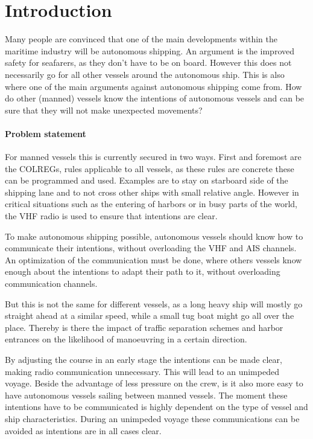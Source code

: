 \chapter{Introduction}
\label{sec:introduction}

Many people are convinced that one of the main developments within the maritime industry will be autonomous shipping. An argument is the improved safety for seafarers, as they don't have to be on board. However this does not necessarily go for all other vessels around the autonomous ship. This is also where one of the main arguments against autonomous shipping come from. How do other (manned) vessels know the intentions of autonomous vessels and can be sure that they will not make unexpected movements?

\subsubsection*{Problem statement}
For manned vessels this is currently secured in two ways. First and foremost are the COLREGs, rules applicable to all vessels, as these rules are concrete these can be programmed and used. Examples are to stay on starboard side of the shipping lane and to not cross other ships with small relative angle. However in critical situations such as the entering of harbors or in busy parts of the world, the VHF radio is used to ensure that intentions are clear.

To make autonomous shipping possible, autonomous vessels should know how to communicate their intentions, without overloading the VHF and AIS channels. An optimization of the communication must be done, where others vessels know enough about the intentions to adapt their path to it, without overloading communication channels.

But this is not the same for different vessels, as a long heavy ship will mostly go straight ahead at a similar speed, while a small tug boat might go all over the place. Thereby is there the impact of traffic separation schemes and harbor entrances on the likelihood of manoeuvring in a certain direction. 

By adjusting the course in an early stage the intentions can be made clear, making radio communication unnecessary. This will lead to an unimpeded voyage. Beside the advantage of less pressure on the crew, is it also more easy to have autonomous vessels sailing between manned vessels.
The moment these intentions have to be communicated is highly dependent on the type of vessel and ship characteristics. During an unimpeded voyage these communications can be avoided as intentions are in all cases clear.

